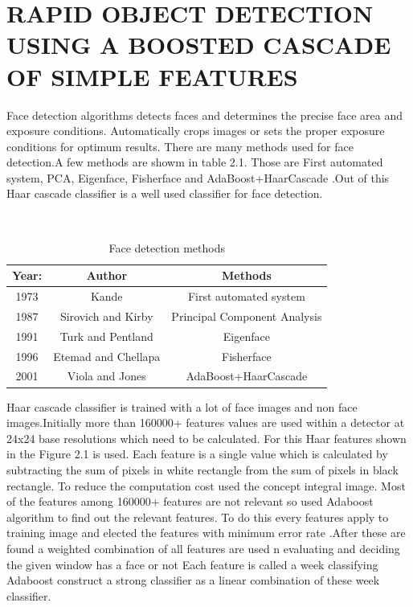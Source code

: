 \section[Rapid Object Detection Using A Boosted Cascade Of Simple Features]{\fontsize{14}{12}\selectfont RAPID OBJECT DETECTION USING A BOOSTED CASCADE OF SIMPLE FEATURES}
Face detection algorithms detects faces and determines the precise face area and exposure conditions. Automatically crops images or sets the proper exposure conditions for optimum results. There are many methods used for face detection.A few methods are showm in table 2.1. Those are First automated system, PCA, Eigenface, Fisherface and AdaBoost+HaarCascade .Out of this Haar cascade classifier is a well used classifier for face detection.
\begin{table}[H]
\centering
\caption{Face detection methods }
~\\
\label{tb1}
\begin{tabular}{|c|c|c|}
\hline
\textbf{Year:} &\textbf{Author}       &\textbf{Methods}  \\
\hline
1973     &Kande    &   First automated system     \\
      
\hline
1987 &Sirovich and Kirby&Principal Component Analysis           \\
 \hline
1991 &Turk and Pentland&Eigenface           \\


\hline
1996     &Etemad and Chellapa   &   Fisherface     \\
      
\hline

2001 &Viola and Jones&AdaBoost+HaarCascade           \\

\hline
\end{tabular}
\end{table}
\noindent
Haar cascade classifier is  trained with a lot of face images and non face  images.Initially more than 160000+ features values are used within a detector at 24x24 base resolutions which need to be calculated.  For this Haar features shown in the Figure 2.1 is used. Each feature  is a single value which is calculated by subtracting the sum of pixels in white rectangle from the sum of pixels in  black rectangle. To reduce the computation cost used the concept integral image. Most of the features among 160000+ features are not relevant so used Adaboost algorithm to find out the relevant features. To do this every features apply to training image and elected the features with minimum error rate .After these are found a weighted combination of all features are used n evaluating and deciding the given window has a face or not Each feature is called a week classifying Adaboost construct a strong classifier as a linear combination of these week classifier.
